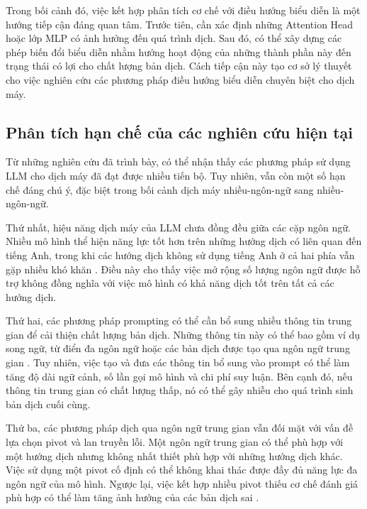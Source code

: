 Trong bối cảnh đó, việc kết hợp phân tích cơ chế với điều hướng biểu diễn là một hướng tiếp cận đáng quan tâm. Trước tiên, cần xác định những Attention Head hoặc lớp MLP có ảnh hưởng đến quá trình dịch. Sau đó, có thể xây dựng các phép biến đổi biểu diễn nhằm hướng hoạt động của những thành phần này đến trạng thái có lợi cho chất lượng bản dịch. Cách tiếp cận này tạo cơ sở lý thuyết cho việc nghiên cứu các phương pháp điều hướng biểu diễn chuyên biệt cho dịch máy.

\subsection{Phân tích hạn chế của các nghiên cứu hiện tại}

Từ những nghiên cứu đã trình bày, có thể nhận thấy các phương pháp sử dụng LLM cho dịch máy đã đạt được nhiều tiến bộ. Tuy nhiên, vẫn còn một số hạn chế đáng chú ý, đặc biệt trong bối cảnh dịch máy nhiều-ngôn-ngữ sang nhiều-ngôn-ngữ.

Thứ nhất, hiệu năng dịch máy của LLM chưa đồng đều giữa các cặp ngôn ngữ. Nhiều mô hình thể hiện năng lực tốt hơn trên những hướng dịch có liên quan đến tiếng Anh, trong khi các hướng dịch không sử dụng tiếng Anh ở cả hai phía vẫn gặp nhiều khó khăn \cite{zhu-etal-2024-multilingual,yang-etal-2025-enanchored}. Điều này cho thấy việc mở rộng số lượng ngôn ngữ được hỗ trợ không đồng nghĩa với việc mô hình có khả năng dịch tốt trên tất cả các hướng dịch.

Thứ hai, các phương pháp prompting có thể cần bổ sung nhiều thông tin trung gian để cải thiện chất lượng bản dịch. Những thông tin này có thể bao gồm ví dụ song ngữ, từ điển đa ngôn ngữ hoặc các bản dịch được tạo qua ngôn ngữ trung gian \cite{lu-etal-2024-chain,oh2025single}. Tuy nhiên, việc tạo và đưa các thông tin bổ sung vào prompt có thể làm tăng độ dài ngữ cảnh, số lần gọi mô hình và chi phí suy luận. Bên cạnh đó, nếu thông tin trung gian có chất lượng thấp, nó có thể gây nhiễu cho quá trình sinh bản dịch cuối cùng.

Thứ ba, các phương pháp dịch qua ngôn ngữ trung gian vẫn đối mặt với vấn đề lựa chọn pivot và lan truyền lỗi. Một ngôn ngữ trung gian có thể phù hợp với một hướng dịch nhưng không nhất thiết phù hợp với những hướng dịch khác. Việc sử dụng một pivot cố định có thể không khai thác được đầy đủ năng lực đa ngôn ngữ của mô hình. Ngược lại, việc kết hợp nhiều pivot thiếu cơ chế đánh giá phù hợp có thể làm tăng ảnh hưởng của các bản dịch sai \cite{mohammadshahi-etal-2024-investigating}.

